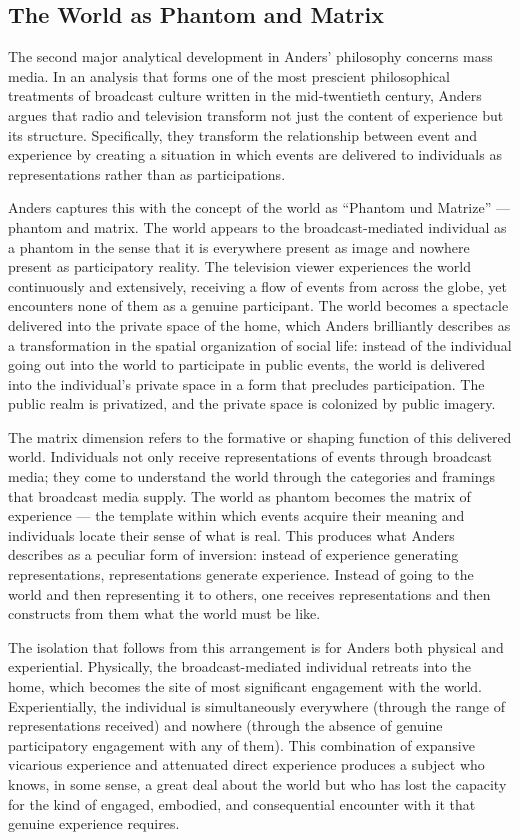 \documentclass[12pt]{memoir}
\begin{document}
\subsection{The World as Phantom and Matrix}

The second major analytical development in Anders' philosophy concerns mass media. In an
analysis that forms one of the most prescient philosophical treatments of broadcast culture
written in the mid-twentieth century, Anders argues that radio and television transform not
just the content of experience but its structure. Specifically, they transform the relationship
between event and experience by creating a situation in which events are delivered to
individuals as representations rather than as participations.\citep[97--211]{anders1956}

Anders captures this with the concept of the world as \enquote{Phantom und Matrize} — phantom
and matrix. The world appears to the broadcast-mediated individual as a phantom in the sense
that it is everywhere present as image and nowhere present as participatory reality. The
television viewer experiences the world continuously and extensively, receiving a flow of events
from across the globe, yet encounters none of them as a genuine participant. The world becomes
a spectacle delivered into the private space of the home, which Anders brilliantly describes as
a transformation in the spatial organization of social life: instead of the individual going out
into the world to participate in public events, the world is delivered into the individual's
private space in a form that precludes participation. The public realm is privatized, and the
private space is colonized by public imagery.

The matrix dimension refers to the formative or shaping function of this delivered world.
Individuals not only receive representations of events through broadcast media; they come to
understand the world through the categories and framings that broadcast media supply. The
world as phantom becomes the matrix of experience — the template within which events acquire
their meaning and individuals locate their sense of what is real. This produces what Anders
describes as a peculiar form of inversion: instead of experience generating representations,
representations generate experience. Instead of going to the world and then representing it to
others, one receives representations and then constructs from them what the world must be like.

The isolation that follows from this arrangement is for Anders both physical and experiential.
Physically, the broadcast-mediated individual retreats into the home, which becomes the site of
most significant engagement with the world. Experientially, the individual is simultaneously
everywhere (through the range of representations received) and nowhere (through the absence of
genuine participatory engagement with any of them). This combination of expansive vicarious
experience and attenuated direct experience produces a subject who knows, in some sense, a
great deal about the world but who has lost the capacity for the kind of engaged, embodied,
and consequential encounter with it that genuine experience requires.
\end{document}
